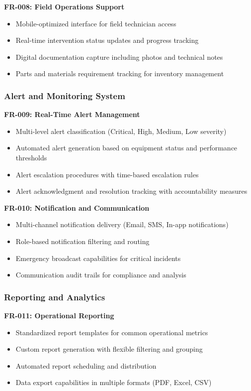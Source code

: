 \textbf{FR-008: Field Operations Support}
\begin{itemize}
\item Mobile-optimized interface for field technician access
\item Real-time intervention status updates and progress tracking
\item Digital documentation capture including photos and technical notes
\item Parts and materials requirement tracking for inventory management
\end{itemize}

\subsubsection{Alert and Monitoring System}
\textbf{FR-009: Real-Time Alert Management}
\begin{itemize}
\item Multi-level alert classification (Critical, High, Medium, Low severity)
\item Automated alert generation based on equipment status and performance thresholds
\item Alert escalation procedures with time-based escalation rules
\item Alert acknowledgment and resolution tracking with accountability measures
\end{itemize}

\textbf{FR-010: Notification and Communication}
\begin{itemize}
\item Multi-channel notification delivery (Email, SMS, In-app notifications)
\item Role-based notification filtering and routing
\item Emergency broadcast capabilities for critical incidents
\item Communication audit trails for compliance and analysis
\end{itemize}

\subsubsection{Reporting and Analytics}
\textbf{FR-011: Operational Reporting}
\begin{itemize}
\item Standardized report templates for common operational metrics
\item Custom report generation with flexible filtering and grouping
\item Automated report scheduling and distribution
\item Data export capabilities in multiple formats (PDF, Excel, CSV)
\end{itemize}

